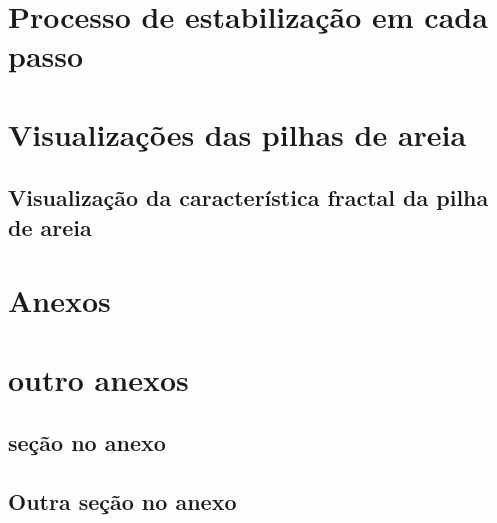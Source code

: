 

\printbibliography[title={REFERÊNCIAS}, heading=bibintoc] %

\appendix
{}

\chapter{Processo de estabilização em cada passo}\label{passo}
\lipsum[10]

\chapter{Visualizações das pilhas de areia}\label{caleidoscopios}
\lipsum[10]


\section*{Visualização da característica fractal da pilha de areia}
\lipsum[10]

\appendix
{}


\chapter{Anexos}
\lipsum[5]

\chapter{outro anexos}

\lipsum[5]

\section*{seção no anexo}

\lipsum[5]

\section*{Outra seção no anexo}

\lipsum[5]

